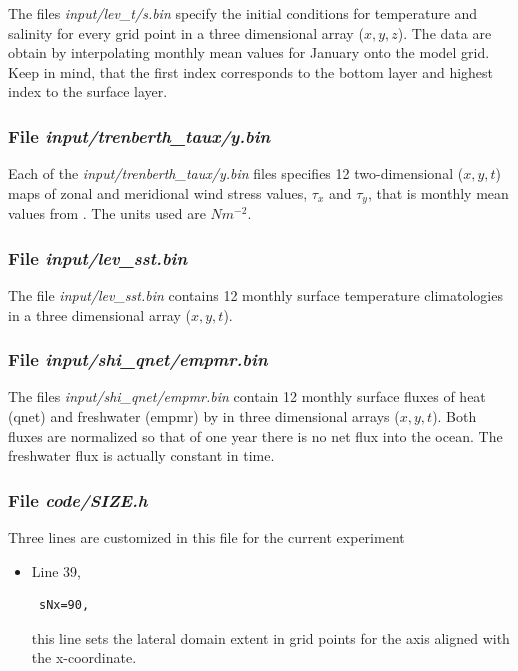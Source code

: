 {The files {\it input/lev\_t/s.bin} specify the initial conditions for
temperature and salinity for every grid point in a three dimensional
array ($x,y,z$). The data are obtain by interpolating
 monthly mean values \citep{Levitus94} for January onto the model
grid. Keep in mind, that the first index corresponds to the bottom
layer and highest index to the surface layer.

\subsubsection{File {\it input/trenberth\_taux/y.bin}}

Each of the {\it input/trenberth\_taux/y.bin} files specifies 12
two-dimensional ($x,y,t$) maps of zonal and meridional wind stress
values, $\tau_{x}$ and $\tau_{y}$, that is monthly mean values from
\citet{trenberth90}. The units used are $Nm^{-2}$.

\subsubsection{File {\it input/lev\_sst.bin}}

The file {\it input/lev\_sst.bin} contains 12 monthly surface
temperature climatologies \citep{Levitus94} in a three
dimensional array ($x,y,t$).

\subsubsection{File {\it input/shi\_qnet/empmr.bin}}

The files {\it input/shi\_qnet/empmr.bin} contain 12 monthly surface
fluxes of heat (qnet) and freshwater (empmr) by 
\citet{jiang99} in three dimensional arrays ($x,y,t$). Both fluxes are
normalized so that of one year there is no net flux into the
ocean. The freshwater flux is actually constant in time.

\subsubsection{File {\it code/SIZE.h}}

Three lines are customized in this file for the current experiment

\begin{itemize}

\item Line 39, 
\begin{verbatim} sNx=90, \end{verbatim} this line sets
the lateral domain extent in grid points for the
axis aligned with the x-coordinate.


\end{itemize}}
